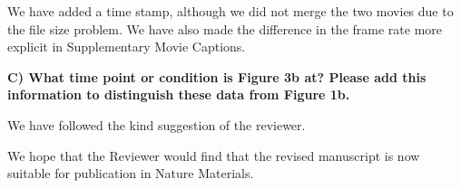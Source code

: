 \documentclass[11pt,a4paper]{article}
\newenvironment{referee}%
{\bigskip\singlespacing\bf}%
{\par\bigskip}
\begin{document}
We have added a time stamp, although we did not merge the two movies due to the file size problem.  
We have also made the difference in the frame rate more explicit in Supplementary Movie Captions. 


\begin{referee}
C) What time point or condition is Figure 3b at? Please add this information to distinguish these data from Figure 1b.
\end{referee}

We have followed the kind suggestion of the reviewer. 

\vspace{1cm}

We hope that the Reviewer would find that the revised manuscript is now suitable for publication in Nature Materials. 
\end{document}
